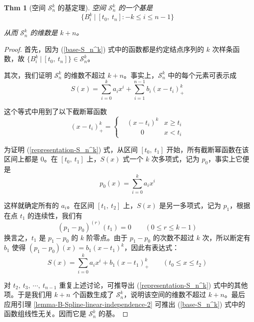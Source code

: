 \documentclass[a4paper]{article}
\newtheorem{theorem}{Thm}
\begin{document}
    \begin{theorem}[空间 $\mathcal{S}_n^k$ 的基定理]
    \label{theorem-base-S_n^k}
        空间 $\mathcal{S}_n^k$ 的一个基是
        \begin{equation}
        \label{base-S_n^k}
            \{ B_i^k\ |\ [t_0,\ t_n]: -k \leqslant i \leqslant n-1 \}
        \end{equation}

        \noindent 从而 $\mathcal{S}_n^k$ 的维数是 $k+n$。
    \end{theorem}
    \begin{proof}[Proof]
        首先，因为 (\ref{base-S_n^k}) 式中的函数都是约定结点序列的 $k$ 次样条函数，故 $\{ B_i^k\ |\ [t_0,\ t_n] \} \in \mathcal{S}_n^k$。

        其次，我们证明 $\mathcal{S}_n^k$ 的维数不超过 $k+n$。事实上，$\mathcal{S}_n^k$ 中的每个元素可表示成
        \begin{equation}
        \label{representation-S_n^k}
            S(x) = \sum_{i = 0}^{k} a_i x^i + \sum_{i = 1}^{n-1} b_i (x - t_i)_+^k
        \end{equation}

        \noindent 这个等式中用到了以下截断幂函数
        \begin{equation*}
            (x - t_i)_+^k = \left\{\begin{aligned}
                & (x - t_i)^k & x \geqslant t_i \\
                & \qquad 0 \qquad & x < t_i
            \end{aligned}\right.
        \end{equation*}

        \noindent 为证明 (\ref{representation-S_n^k}) 式，从区间 $[t_0,\ t_1]$ 开始，所有截断幂函数在该区间上都是 $0$。在 $[t_0,\ t_1]$ 上，$S(x)$ 式一个 $k$ 次多项式，记为 $p_0$，事实上它便是
        \begin{equation}
            p_0(x) = \sum_{i = 0}^{k} a_i x^i
        \end{equation}

        \noindent 这样就确定所有的 $a_i$。在区间 $[t_1,\ t_2]$ 上，$S(x)$ 是另一多项式，记为 $p_1$，根据在点 $t_1$ 的连续性，我们有
        \begin{equation*}
            (p_1 - p_0)^{(r)} (t_1) = 0 \qquad (0 \leqslant r \leqslant k-1)
        \end{equation*}
        换言之，$t_1$ 是 $p_1 - p_0$ 的 $k$ 阶零点。由于 $p_1 - p_0$ 的次数不超过 $k$ 次，所以断定有 $b_1$ 使得 $(p_1 - p_0)(x) = b_1 (x - t_1)^k$，因此有表达式：
        \begin{equation*}
            S(x) = \sum_{i = 0}^{k} a_i x^i + b_1 (x - t_1)_+^k \qquad (t_0 \leqslant x \leqslant t_2)
        \end{equation*}

        \noindent 对 $t_2,\ t_3,\ \cdots,\ t_{n-1}$ 重复上述讨论，可推导出 (\ref{representation-S_n^k}) 式中的其他项。于是我们用 $k+n$ 个函数生成了 $\mathcal{S}_n^k$，说明该空间的维数不超过 $k+n$。最后应用引理 \ref{lemma-B-Spline-linear-independence-2} 可推出 (\ref{base-S_n^k}) 式中的函数组线性无关。因而它是 $\mathcal{S}_n^k$ 的基。
    \end{proof}
\end{document}
